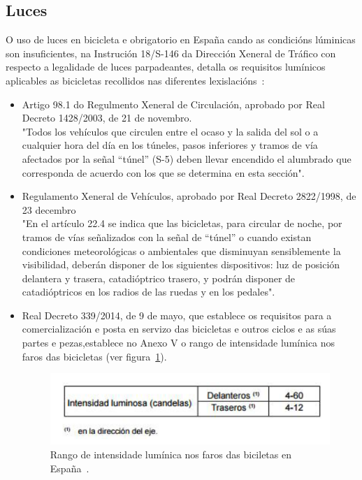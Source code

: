 \subsection{Luces}
O uso de luces en bicicleta e obrigatorio en España cando as condicións lúminicas son insuficientes, na Instrución 18/S-146 da Dirección Xeneral de Tráfico con respecto a legalidade de luces parpadeantes, detalla os requisitos lumínicos aplicables as bicicletas recollidos nas diferentes lexislacións~\cite{Instruccion18S146}:
\begin{itemize}
  \item Artigo  98.1  do  Regulmento  Xeneral  de Circulación, aprobado por Real Decreto 1428/2003, de 21 de novembro.\\
  "Todos los vehículos que circulen entre el ocaso y la salida del sol o a cualquier hora del día en los túneles, pasos inferiores y tramos de vía afectados por la señal “túnel” (S-5) deben llevar encendido el   alumbrado   que   corresponda   de   acuerdo   con   los   que   se determina en esta sección".
  \item  Regulamento Xeneral de Vehículos, aprobado por Real Decreto 2822/1998, de 23 decembro\\
  "En el artículo 22.4 se indica que las bicicletas, para circular de noche, por tramos   de   vías   señalizados   con   la   señal   de   “túnel”   o   cuando   existan condiciones  meteorológicas  o  ambientales  que  disminuyan  sensiblemente  la visibilidad,  deberán  disponer  de  los  siguientes  dispositivos: luz  de  posición delantera   y   trasera,   catadióptrico   trasero,   y   podrán   disponer   de catadióptricos en los radios de las ruedas y en los pedales".
  \item Real Decreto 339/2014, de 9 de mayo, que establece os requisitos para a comercialización e posta en servizo das bicicletas e outros ciclos e as súas partes e pezas,establece no Anexo V o rango de intensidade lumínica nos faros das bicicletas (ver figura~\ref{fig:lexislacion_luminica}).

  \begin{figure}[tbp]
    \centering
    \includegraphics[scale=0.6]{imaxes/lexislacion-luminica.png}
    \caption{Rango de intensidade lumínica nos faros das biciletas en España~\cite{Instruccion18S146}.}
    \label{fig:lexislacion_luminica}
  \end{figure}
\end{itemize}


